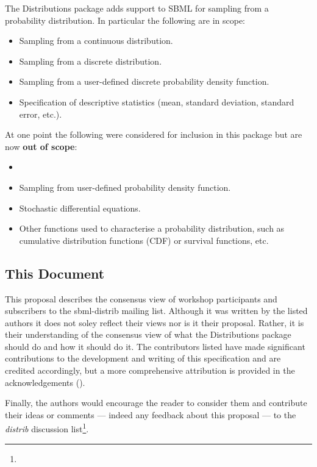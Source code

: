 \documentclass[draftspec]{sbmlpkgspec}
\newcommand{\distribshort}{\emph{distrib}\xspace}
\newcommand{\distrib}{Distributions\xspace}
\begin{document}
The \distrib package adds support to SBML for sampling from a
probability distribution. In particular the following are in scope:

\begin{itemize}
\item Sampling from a continuous distribution.
\item Sampling from a discrete distribution.
\item Sampling from a user-defined discrete probability density function.
\item Specification of descriptive statistics (mean, standard
  deviation, standard error, etc.).
\end{itemize}

At one point the following were considered for inclusion in this
package but are now \textbf{out of scope}:

\begin{itemize}
\item {}
\item Sampling from user-defined probability density function.
\item Stochastic differential equations.
\item Other functions used to characterise a probability distribution,
  such as cumulative distribution functions (CDF) or survival functions, etc.
\end{itemize}

\subsection{This Document}

This proposal describes the consensus view of workshop participants
and subscribers to the sbml-distrib mailing list. Although it was
written by the listed authors it does not soley reflect their views nor is
it their proposal. Rather, it is their understanding of the consensus
view of what the \distrib package should do and how it should do
it. The contributors listed have made significant contributions to the
development and writing of this specification and are credited
accordingly, but a more comprehensive attribution is provided in the
acknowledgements ().

Finally, the authors would encourage the
reader to consider them and contribute their ideas or comments ---
indeed any feedback about this proposal --- to the \distribshort
discussion list\footnote{}.
\end{document}
